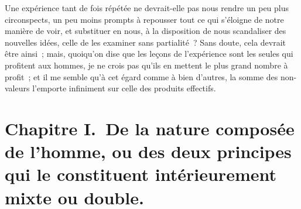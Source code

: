 \documentclass[french,twoside]{book} %
\newcommand\chapteropen{} %
\begin{document}
Une expérience tant de fois répétée ne devrait-elle pas nous rendre un peu plus circonspects, un peu moins prompts à repousser tout ce qui s’éloigne de notre manière de voir, et substituer en nous, à la disposition de nous scandaliser des nouvelles idées, celle de les examiner sans partialité ? Sans doute, cela devrait être ainsi ; mais, quoiqu’on dise que les leçons de l’expérience sont les seules qui profitent aux hommes, je ne crois pas qu’ils en mettent le plus grand nombre à profit ; et il me semble qu’à cet égard comme à bien d’autres, la somme des non-valeurs l’emporte infiniment sur celle des produits effectifs.

\chapteropen
\chapter[{Chapitre I. De la nature composée de l’homme, ou des deux principes qui le constituent intérieurement mixte ou double.}]{Chapitre I. De la nature composée de l’homme, ou des deux principes qui le constituent intérieurement mixte ou double.}\renewcommand{\leftmark}{Chapitre I. De la nature composée de l’homme, ou des deux principes qui le constituent intérieurement mixte ou double.}
\end{document}
